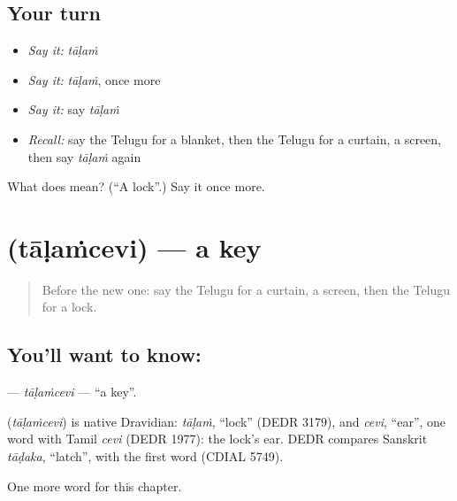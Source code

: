 \subsection*{Your turn}
\begin{itemize}
\raggedright
  \item \emph{Say it:} \emph{tāḷaṁ}
  \item \emph{Say it:} \emph{tāḷaṁ}, once more
  \item \emph{Say it:} say \emph{tāḷaṁ}
  \item \emph{Recall:} say the Telugu for a blanket, then the Telugu for a curtain, a screen, then say \emph{tāḷaṁ} again
\end{itemize}

\begin{tcolorbox}[breakable,colback=teal!4,colframe=teal!35!black,title={Before you move on}]
What does  mean? (\textquotedblleft{}A lock\textquotedblright{}.) Say it once more.
\end{tcolorbox}
\section[\texorpdfstring{\te{తాళంచెవి} (tāḷaṁcevi)}{తాళంచెవి (tāḷaṁcevi)}]{ (tāḷaṁcevi) — a key}

\label{lesson:TE-C110-talamcevi}



\begin{quote}
Before the new one: say the Telugu for a curtain, a screen, then the Telugu for a lock.
\end{quote}

\subsection*{You'll want to know: }
\textbf{} — \emph{tāḷaṁcevi} — \textquotedblleft{}a key\textquotedblright{}.

\begin{cousinweb}
\textbf{} (\emph{tāḷaṁcevi}) is native Dravidian: \emph{tāḷaṁ}, \textquotedblleft{}lock\textquotedblright{} (DEDR 3179), and \emph{cevi}, \textquotedblleft{}ear\textquotedblright{}, one word with Tamil \emph{cevi} (DEDR 1977): the lock's ear. DEDR compares Sanskrit \emph{tāḍaka}, \textquotedblleft{}latch\textquotedblright{}, with the first word (CDIAL 5749).
\end{cousinweb}

\begin{grammarlens}[title={What you've built}]
One more word for this chapter.
\end{grammarlens}

